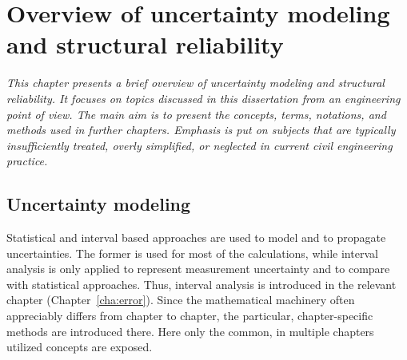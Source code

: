 
\chapter{Overview of uncertainty modeling and structural reliability}
\label{cha:overview}

\ifpdf
    \graphicspath{{Chapter2/Figs/Raster/}{Chapter2/Figs/PDF/}{Chapter2/Figs/}}
\else
    \graphicspath{{Chapter2/Figs/Vector/}{Chapter2/Figs/}}
\fi

\leftskip=1cm
\noindent
\emph{This chapter presents a brief overview of uncertainty modeling and structural reliability. It focuses on topics discussed in this dissertation from an engineering point of view. The main aim is to present the concepts, terms, notations, and methods used in further chapters. Emphasis is put on subjects that are typically insufficiently treated, overly simplified, or neglected in current civil engineering practice.}

\leftskip=0pt\rightskip=0pt


\section{Uncertainty modeling}

Statistical and interval based approaches are used to model and to propagate uncertainties. The former is used for most of the calculations, while interval analysis is only applied to represent measurement uncertainty and to compare with statistical approaches. Thus, interval analysis is introduced in the relevant chapter (Chapter~\ref{cha:error}). Since the mathematical machinery often appreciably differs from chapter to chapter, the particular, chapter-specific methods are introduced there. Here only the common, in multiple chapters utilized concepts are exposed.

